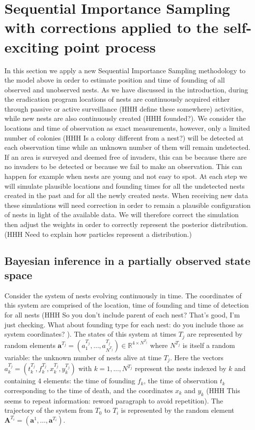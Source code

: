 \documentclass{article}
\renewcommand{\vec}[1]{\mathbf{#1}}
\begin{document}
\section{Sequential Importance Sampling with corrections applied to the self-exciting point process} \label{sec:SISMethod}

In this section we apply a new Sequential Importance Sampling methodology to the model above in order to estimate position and time of founding of all observed and unobserved nests. As we have discussed in the introduction, during the eradication program locations of nests are continuously acquired either through passive or active surveillance (HHH define these somewhere) activities, while new nests are also continuously created (HHH founded?). We consider the locations and time of observation as exact measurements, however, only a limited number of colonies (HHH Is a colony different from a nest?) will be detected at each observation time while an unknown number of them will remain undetected. If an area is surveyed and deemed free of invaders, this can be because there are no invaders to be detected or because we fail to make an observation. This can happen for example when nests are young and not easy to spot. At each step we will simulate plausible locations and founding times for all the undetected nests created in the past and for all the newly created nests. When receiving new data these simulations will need correction in order to remain a plausible configuration of nests in light of the available data. We will therefore correct the simulation then adjust the weights in order to correctly represent the posterior distribution. (HHH Need to explain how particles represent a distribution.)

\subsection{Bayesian inference in a partially observed state space} \label{subsec:POS}

Consider the system of nests evolving continuously in time. The coordinates of this system are comprised of the location, time of founding and time of detection for all nests (HHH So you don't include parent of each nest? That's good, I'm just checking. What about founding type for each nest: do you include those as system coordinates? ). The states of this system at times $T_j$ are represented by random elements $\vec{a}^{T_j} = (a^{T_j}_1, \dots, a^{T_j}_{N^{T_j}}) \in \mathbb{R}^{4\times N^{T_j}}$ where $N^{T_j}$ is itself a random variable: the unknown number of nests alive at time $T_j$. Here the vectors $a^{T_j}_k = (t_k^{T_j}, f_k^{T_j}, x_k^{T_j}, y_k^{T_j})$ with $k = 1, \dots , N^{T_j}$ represent the nests indexed by $k$ and containing 4 elements: the time of founding $f_k$, the time of observation $t_k$ corresponding to the time of death, and the coordinates $x_k$ and $y_k$ (HHH This seems to repeat information: reword paragraph to avoid repetition).
The trajectory of the system from $T_0$ to $T_i$ is represented by the random element $\vec{A}^{T_i} = (\vec{a}^1, \dots, \vec{a}^{T_i})$.
\end{document}
